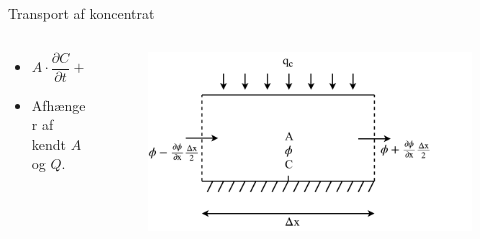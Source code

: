 \begin{frame}{Transport af koncentrat}{}
	\vfill\vfill\centering
\begin{columns}
	\begin{column}{0.4\textwidth}
		\begin{itemize}
			\vspace{9mm}
			\item<1-> $	A \cdot \dfrac{\partial C}{\partial t} + Q \cdot \dfrac{\partial C}{\partial x} = 0$
			\vspace{9mm}
			\item<2-> Afhænger af kendt $A$ og $Q$.
		\end{itemize}
	\end{column}
	
	\begin{column}{0.48\textwidth}
		\begin{figure}[H]
			\centering
			\includegraphics[width=1.1\textwidth]{Sections/pictures/poopvolume.pdf}
		\end{figure}
	\end{column}
\end{columns}


\vfill\vfill		
\end{frame}

